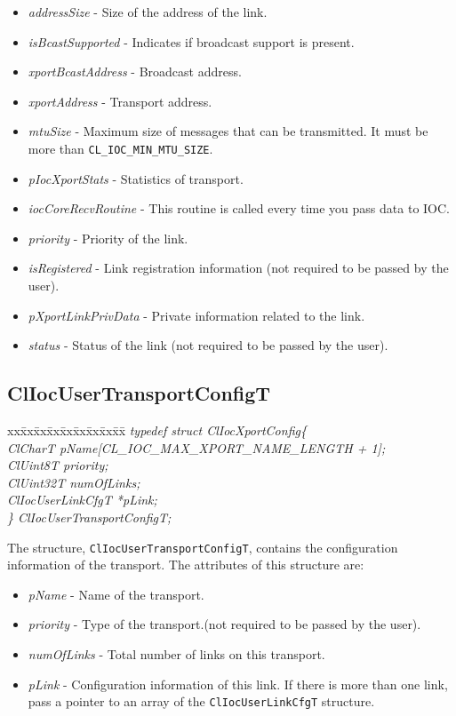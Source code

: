 \begin{flushleft}
\begin{itemize}
\item
\textit{addressSize} - Size of the address of the link.
\item
\textit{isBcastSupported} - Indicates if broadcast support is present.
\item
\textit{xportBcastAddress} - Broadcast address.
\item
\textit{xportAddress} - Transport address.
\item
\textit{mtuSize} - Maximum size of messages that can be transmitted.
 It must be more than {\tt{CL\_\-IOC\_\-MIN\_\-MTU\_\-SIZE}}.
\item
\textit{pIocXportStats} - Statistics of transport.
\item
\textit{iocCoreRecvRoutine} - This routine is called every time you pass data to IOC.
\item
\textit{priority} - Priority of the link.
\item
\textit{isRegistered} - Link registration information (not required to be passed by the user).
\item
\textit{pXportLinkPrivData} - Private information related to the link.
\item
\textit{status} - Status of the link (not required to be passed by the user).
\end{itemize}





\subsection{ClIocUserTransportConfigT}
\begin{tabbing}
 xx\=xx\=xx\=xx\=xx\=xx\=xx\=xx\=xx\=\kill
 \textit{typedef struct ClIocXportConfig\{}\\
 \>\>\>\>\textit{ClCharT pName\mbox{[}CL\_IOC\_MAX\_XPORT\_NAME\_LENGTH + 1\mbox{]};}\\
 \>\>\>\>\textit{ClUint8T priority;}\\
 \>\>\>\>\textit{ClUint32T numOfLinks;}\\
 \>\>\>\>\textit{ClIocUserLinkCfgT *pLink;}\\
 \textit{\} ClIocUserTransportConfigT;}\end{tabbing}
  The structure, {\tt{ClIocUserTransportConfigT}}, contains the configuration information of the transport. The attributes of this structure are:
  \begin{itemize}
  \item
\textit{pName} - Name of the transport.
  \item
\textit{priority} - Type of the transport.(not required to be passed by the user). 
  \item
\textit{numOfLinks} - Total number of links on this transport.
  \item
\textit{pLink} - Configuration information of this link. If there is more than one link,
 pass a pointer to an array of the {\tt{ClIocUserLinkCfgT}} structure.
\end{itemize}



\end{flushleft}
